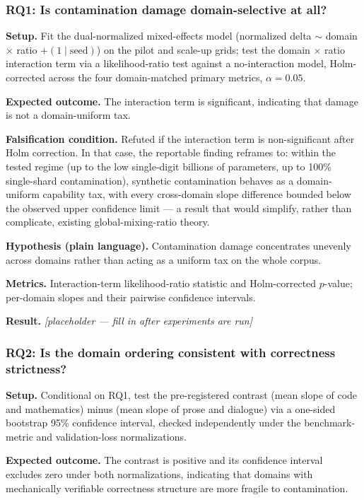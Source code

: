 \documentclass[11pt]{article}
\newcommand{\ph}{\textit{[placeholder --- fill in after experiments are run]}}
\begin{document}
\subsubsection{RQ1: Is contamination damage domain-selective at all?}
\textbf{Setup.} Fit the dual-normalized mixed-effects model (normalized delta $\sim$ domain $\times$ ratio $+ (1 \mid \text{seed})$) on the pilot and scale-up grids; test the domain $\times$ ratio interaction term via a likelihood-ratio test against a no-interaction model, Holm-corrected across the four domain-matched primary metrics, $\alpha = 0.05$.

\textbf{Expected outcome.} The interaction term is significant, indicating that damage is not a domain-uniform tax.

\textbf{Falsification condition.} Refuted if the interaction term is non-significant after Holm correction. In that case, the reportable finding reframes to: within the tested regime (up to the low single-digit billions of parameters, up to 100\% single-shard contamination), synthetic contamination behaves as a domain-uniform capability tax, with every cross-domain slope difference bounded below the observed upper confidence limit --- a result that would simplify, rather than complicate, existing global-mixing-ratio theory.

\textbf{Hypothesis (plain language).} Contamination damage concentrates unevenly across domains rather than acting as a uniform tax on the whole corpus.

\textbf{Metrics.} Interaction-term likelihood-ratio statistic and Holm-corrected $p$-value; per-domain slopes and their pairwise confidence intervals.

\textbf{Result.} \ph

\subsubsection{RQ2: Is the domain ordering consistent with correctness strictness?}
\textbf{Setup.} Conditional on RQ1, test the pre-registered contrast (mean slope of code and mathematics) minus (mean slope of prose and dialogue) via a one-sided bootstrap 95\% confidence interval, checked independently under the benchmark-metric and validation-loss normalizations.

\textbf{Expected outcome.} The contrast is positive and its confidence interval excludes zero under both normalizations, indicating that domains with mechanically verifiable correctness structure are more fragile to contamination.
\end{document}
